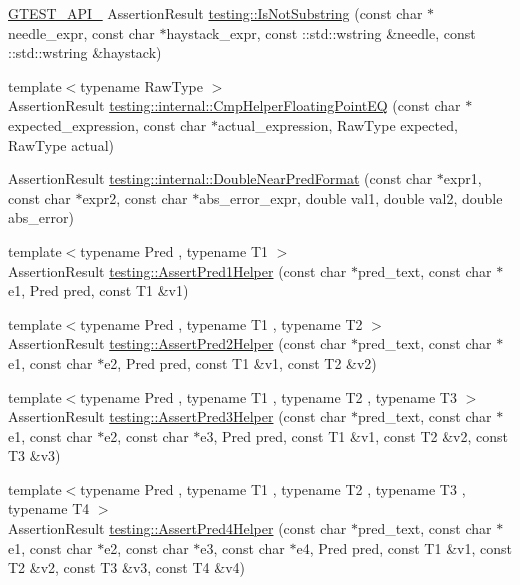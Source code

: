 \begin{DoxyCompactItemize}
\item 
\hyperlink{gtest-port_8h_aa73be6f0ba4a7456180a94904ce17790}{G\-T\-E\-S\-T\-\_\-\-A\-P\-I\-\_\-} Assertion\-Result \hyperlink{namespacetesting_a2205435db77abd191fb8209bba41862a}{testing\-::\-Is\-Not\-Substring} (const char $\ast$needle\-\_\-expr, const char $\ast$haystack\-\_\-expr, const \-::std\-::wstring \&needle, const \-::std\-::wstring \&haystack)
\item 
{\footnotesize template$<$typename Raw\-Type $>$ }\\Assertion\-Result \hyperlink{namespacetesting_1_1internal_aaf581f35dfe9f1a3705f99b455a18abd}{testing\-::internal\-::\-Cmp\-Helper\-Floating\-Point\-E\-Q} (const char $\ast$expected\-\_\-expression, const char $\ast$actual\-\_\-expression, Raw\-Type expected, Raw\-Type actual)
\item 
Assertion\-Result \hyperlink{namespacetesting_1_1internal_a4f70b36c624b54c2362aeecc2f05ee8c}{testing\-::internal\-::\-Double\-Near\-Pred\-Format} (const char $\ast$expr1, const char $\ast$expr2, const char $\ast$abs\-\_\-error\-\_\-expr, double val1, double val2, double abs\-\_\-error)
\item 
{\footnotesize template$<$typename Pred , typename T1 $>$ }\\Assertion\-Result \hyperlink{namespacetesting_a7f73180474723be6e92185d6fa9e7c9f}{testing\-::\-Assert\-Pred1\-Helper} (const char $\ast$pred\-\_\-text, const char $\ast$e1, Pred pred, const T1 \&v1)
\item 
{\footnotesize template$<$typename Pred , typename T1 , typename T2 $>$ }\\Assertion\-Result \hyperlink{namespacetesting_aa6587938029dd8733ecb885068f08247}{testing\-::\-Assert\-Pred2\-Helper} (const char $\ast$pred\-\_\-text, const char $\ast$e1, const char $\ast$e2, Pred pred, const T1 \&v1, const T2 \&v2)
\item 
{\footnotesize template$<$typename Pred , typename T1 , typename T2 , typename T3 $>$ }\\Assertion\-Result \hyperlink{namespacetesting_ac92dcbd00a0ffb2913e65d286e321a22}{testing\-::\-Assert\-Pred3\-Helper} (const char $\ast$pred\-\_\-text, const char $\ast$e1, const char $\ast$e2, const char $\ast$e3, Pred pred, const T1 \&v1, const T2 \&v2, const T3 \&v3)
\item 
{\footnotesize template$<$typename Pred , typename T1 , typename T2 , typename T3 , typename T4 $>$ }\\Assertion\-Result \hyperlink{namespacetesting_ae90c778d69db4682e8fd8baaa0a9f9cd}{testing\-::\-Assert\-Pred4\-Helper} (const char $\ast$pred\-\_\-text, const char $\ast$e1, const char $\ast$e2, const char $\ast$e3, const char $\ast$e4, Pred pred, const T1 \&v1, const T2 \&v2, const T3 \&v3, const T4 \&v4)

\end{DoxyCompactItemize}
